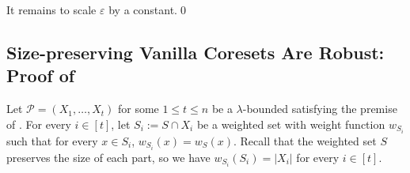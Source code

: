 \documentclass[letterpaper,11pt]{article}
\theoremstyle{plain}
\theoremstyle{definition}
\theoremstyle{remark}
\newcommand{\eps}{\varepsilon}
\newcommand{\calP}{\mathcal{P}}
\begin{document}
It remains to scale $\eps$ by a constant.\qed



















































































      \subsection{Size-preserving Vanilla Coresets Are Robust: Proof of~}
\label{sec:new proof}

\SizePreservingAreRobust*

Let $\calP=(X_1,\dots, X_t)$ for some $1\le t\le n$ be a $\lambda$-bounded satisfying the premise of .
For every $i\in [t]$, let $S_i:=S\cap X_i$ be a weighted set with weight function $w_{S_i}$ such that for every $x\in S_i$, $w_{S_i}(x) = w_S(x)$.
Recall that the weighted set $S$ preserves the size of each part, so we have $w_{S_i}(S_i) = |X_i|$ for every $i\in [t]$.
\end{document}

